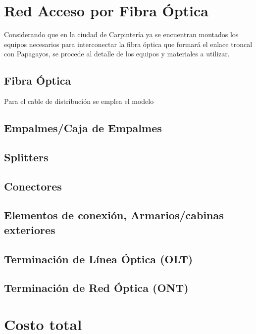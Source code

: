 \section{Red Acceso por Fibra Óptica}
Considerando que en la ciudad de Carpintería ya se encuentran montados los equipos necesarios para interconectar la fibra óptica que formará el enlace troncal con Papagayos, se procede al detalle de los equipos y materiales a utilizar.
\subsection{Fibra Óptica}
Para el cable de distribución se emplea el modelo 
\subsection{Empalmes/Caja de Empalmes}

\subsection{Splitters}

\subsection{Conectores}

\subsection{Elementos de conexión, Armarios/cabinas exteriores}

\subsection{Terminación de Línea Óptica (OLT)}

\subsection{Terminación de Red Óptica (ONT)}

\section{Costo total}